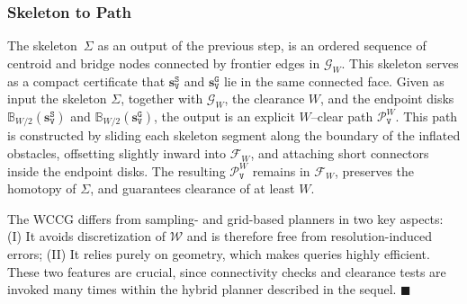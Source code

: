 \subsubsection{Skeleton to Path}
The {skeleton}~$\Sigma$ as an output of the previous step,
is an ordered sequence of centroid and bridge nodes connected by frontier
edges in $\mathcal{G}_W$. This skeleton serves as a compact certificate that
$\mathbf{s}_\texttt{V}^{\texttt{S}}$ and $\mathbf{s}_\texttt{V}^{\texttt{G}}$
lie in the same connected face. Given as input the skeleton $\Sigma$, together
with $\mathcal{G}_W$, the clearance $W$, and the endpoint disks
$\mathbb{B}_{W/2}(\mathbf{s}_\texttt{V}^{\texttt{S}})$ and
$\mathbb{B}_{W/2}(\mathbf{s}_\texttt{V}^{\texttt{G}})$, the output is an explicit
$W$--clear path $\mathcal{P}^W_\texttt{V}$. This path is constructed by sliding
each skeleton segment along the boundary of the inflated obstacles, offsetting
slightly inward into $\mathcal{F}_W$, and attaching short connectors inside the
endpoint disks. The resulting $\mathcal{P}^W_\texttt{V}$ remains in
$\mathcal{F}_W$, preserves the homotopy of $\Sigma$, and guarantees clearance of
at least $W$.


\begin{remark}\label{remark:wccg}
  The WCCG differs from sampling- and grid-based planners in two key aspects:
  (I) It avoids discretization of $\mathcal{W}$ and is therefore free from
  resolution-induced errors;
  (II) It relies purely on geometry, which makes
queries highly efficient. These two features are crucial, since connectivity
checks and clearance tests are invoked many times within the hybrid
planner described in the sequel. \hfill$\blacksquare$
\end{remark}





